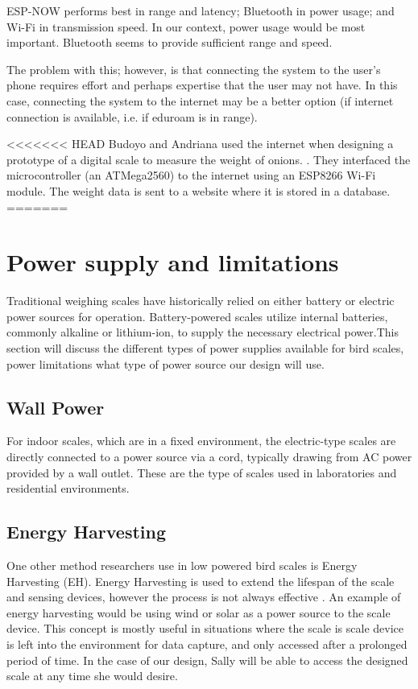 \documentclass[class=report,11pt,crop=false]{standalone}
\begin{document}
ESP-NOW performs best in range and latency; Bluetooth in power usage; and Wi-Fi in transmission speed. In our context, power usage would be most important. Bluetooth seems to provide sufficient range and speed.

The problem with this; however, is that connecting the system to the user's phone requires effort and perhaps expertise that the user may not have. In this case, connecting the system to the internet may be a better option (if internet connection is available, i.e. if eduroam is in range). 

<<<<<<< HEAD
Budoyo and Andriana used the internet when designing a prototype of a digital scale to measure the weight of onions. \cite{iot}. They interfaced the microcontroller (an  ATMega2560) to the internet using an ESP8266 Wi-Fi module. The weight data is sent to a website where it is stored in a database.
=======
\pagebreak
\section{Power supply and limitations}	
Traditional weighing scales have historically relied on either battery or electric power sources for operation. Battery-powered scales utilize internal batteries, commonly alkaline or lithium-ion, to supply the necessary electrical power.This section will discuss the different types of power supplies available for bird scales, power limitations what type of power source our design will use.

\subsection{Wall Power}
For indoor scales, which are in a fixed environment, the electric-type scales are directly connected to a power source via a cord, typically drawing from AC power provided by a wall outlet. These are the type of scales used in laboratories and residential environments. 

\subsection{Energy Harvesting}
One other method researchers use in low powered bird scales is Energy Harvesting (EH). Energy Harvesting is used to extend the lifespan of the scale and sensing devices, however the process is not always effective \cite{EnergyHarvesting}. An example of energy harvesting would be using wind or solar as a power source to the scale device. This concept is mostly useful in situations where the scale is scale device is left into the environment for data capture, and only accessed after a prolonged period of time. In the case of our design, Sally will be able to access the designed scale at any time she would desire.  
\end{document}
